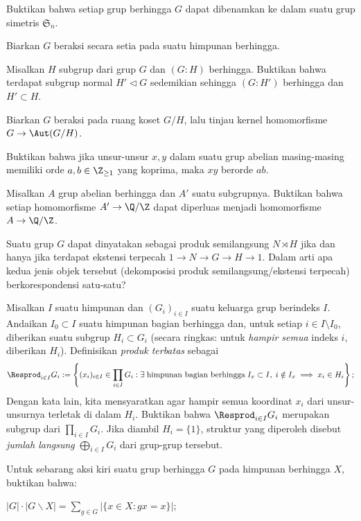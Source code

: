 \begin{Exercises}
	\item Buktikan bahwa setiap grup berhingga $G$ dapat dibenamkan ke dalam suatu grup simetris $\mathfrak{S}_n$. \begin{hint} Biarkan $G$ beraksi secara setia pada suatu himpunan berhingga.\end{hint}
	\item Misalkan $H$ subgrup dari grup $G$ dan $(G:H)$ berhingga. Buktikan bahwa terdapat subgrup normal $H' \lhd G$ sedemikian sehingga $(G:H')$ berhingga dan $H' \subset H$. \begin{hint} Biarkan $G$ beraksi pada ruang koset $G/H$, lalu tinjau kernel homomorfisme $G \to \Aut(G/H)$. \end{hint}
	\item Buktikan bahwa jika unsur-unsur $x, y$ dalam suatu grup abelian masing-masing memiliki orde $a,b \in \Z_{\geq 1}$ yang koprima, maka $xy$ berorde $ab$.
	\item Misalkan $A$ grup abelian berhingga dan $A'$ suatu subgrupnya. Buktikan bahwa setiap homomorfisme $A' \to \Q/\Z$ dapat diperluas menjadi homomorfisme $A \to \Q/\Z$.
	\item Suatu grup $G$ dapat dinyatakan sebagai produk semilangsung $N \rtimes H$ jika dan hanya jika terdapat ekstensi terpecah $1 \to N \to G \to H \to 1$. Dalam arti apa kedua jenis objek tersebut (dekomposisi produk semilangsung/ekstensi terpecah) berkorespondensi satu-satu?
	\item Misalkan $I$ suatu himpunan dan $(G_i)_{i \in I}$ suatu keluarga grup berindeks $I$. Andaikan $I_0 \subset I$ suatu himpunan bagian berhingga dan, untuk setiap $i \in I \setminus I_0$, diberikan suatu subgrup $H_i \subset G_i$ (secara ringkas: untuk \emph{hampir semua} indeks $i$, diberikan $H_i$). Definisikan \emph{produk terbatas} sebagai
	    \[ \Resprod_{i \in I} G_i := \left\{ (x_i)_{i \in I} \in \prod_{i \in I} G_i : \exists \;\text{himpunan bagian berhingga}\; I_x \subset I, \; i \notin I_x \implies x_i \in H_i \right\}; \]
		Dengan kata lain, kita mensyaratkan agar hampir semua koordinat $x_i$ dari unsur-unsurnya terletak di dalam $H_i$. Buktikan bahwa $\Resprod_{i \in I} G_i$ merupakan subgrup dari $\prod_{i \in I} G_i$. Jika diambil $H_i = \{1\}$, struktur yang diperoleh disebut \emph{jumlah langsung} $\bigoplus_{i \in I} G_i$ dari grup-grup tersebut.
	\item Untuk sebarang aksi kiri suatu grup berhingga $G$ pada himpunan berhingga $X$, buktikan bahwa:
		\begin{compactenum}[(i)]
			\item $|G| \cdot |G \backslash X| = \sum_{g \in G} |\{x \in X : gx=x \}|$;

\end{compactenum}
\end{Exercises}
